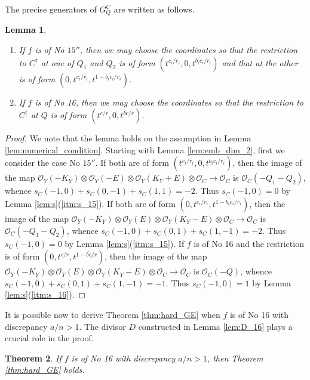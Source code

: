 \documentclass[a4paper,11pt]{amsart}
\newtheorem{theorem}{Theorem}[section]
\newtheorem{lemma}[theorem]{Lemma}
\theoremstyle{definition}
\theoremstyle{remark}
\numberwithin{equation}{section}
\newcommand{\cO}{{\mathcal O}}
\begin{document}
The precise generators of $G_Q^C$ are written as follows.

\begin{lemma}\label{lem:further}
\begin{enumerate}
\item\label{itm:further_15}
If $f$ is of No $\textrm{15}''$,
then we may choose the coordinates so that the restriction to $C^\dag$ at
one of $Q_1$ and $Q_2$ is of form $(t^{c_i/r_i},0,t^{\overline{b_ic_i}/r_i})$
and that at the other is of form $(0,t^{c_i/r_i},t^{1-\overline{b_ic_i}/r_i})$.
\item\label{itm:further_16}
If $f$ is of No 16,
then we may choose the coordinates so that the restriction to $C^\dag$ at $Q$
is of form $(t^{c/r},0,t^{\overline{bc}/r})$.
\end{enumerate}
\end{lemma}

\begin{proof}
We note that the lemma holds
on the assumption in Lemma \ref{lem:numerical_condition}.
Starting with Lemma \ref{lem:emb_dim_2},
first we consider the case No $\textrm{15}''$.
If both are of form  $(t^{c_i/r_i},0,t^{\overline{b_ic_i}/r_i})$,
then the image of the map
$\cO_Y(-K_Y) \otimes \cO_Y(-E) \otimes \cO_Y(K_Y+E) \otimes \cO_C \to \cO_C$
is $\cO_C(-Q_1-Q_2)$,
whence $s_C(-1,0)+s_C(0,-1)+s_C(1,1)=-2$.
Thus $s_C(-1,0)=0$ by Lemma \ref{lem:s}(\ref{itm:s_15}).
If both are of form $(0, t^{c_i/r_i}, t^{1-\overline{b_ic_i}/r_i})$,
then the image of the map
$\cO_Y(-K_Y) \otimes \cO_Y(E) \otimes \cO_Y(K_Y-E) \otimes \cO_C \to \cO_C$
is $\cO_C(-Q_1-Q_2)$,
whence $s_C(-1,0)+s_C(0,1)+s_C(1,-1)=-2$.
Thus $s_C(-1,0)=0$ by Lemma \ref{lem:s}(\ref{itm:s_15}).
If $f$ is of No 16 and
the restriction is of form $(0,t^{c/r},t^{1-\overline{bc}/r})$,
then the image of the map
$\cO_Y(-K_Y) \otimes \cO_Y(E) \otimes \cO_Y(K_Y-E) \otimes \cO_C \to \cO_C$
is $\cO_C(-Q)$,
whence $s_C(-1,0)+s_C(0,1)+s_C(1,-1)=-1$.
Thus $s_C(-1,0)=1$ by Lemma \ref{lem:s}(\ref{itm:s_16}).
\end{proof}

It is possible now to derive Theorem \ref{thm:hard_GE}
when $f$ is of No 16 with discrepancy $a/n>1$.
The divisor $D$ constructed in Lemma \ref{lem:D_16}
plays a crucial role in the proof.

\begin{theorem}\label{thm:hard_GE16}
If $f$ is of No 16 with discrepancy $a/n>1$,
then Theorem \textup{\ref{thm:hard_GE}} holds.
\end{theorem}
\end{document}
